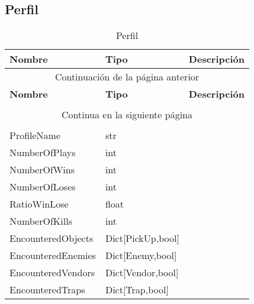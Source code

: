 \subsection{Perfil}

\begin{longtable}[H]{
    @{}
    l
    l
    l
    @{}
    }%

    \toprule        %
    \textbf{Nombre} & \textbf{Tipo} & \textbf{Descripción} \\      %
    \midrule        %
    \endfirsthead   %

    \multicolumn{3}{c}{Continuación de la página anterior}\\
    \toprule
    \textbf{Nombre} & \textbf{Tipo} & \textbf{Descripción} \\\\      %
    \midrule        %
    \endhead        %

    \midrule
    \multicolumn{3}{c}{Continua en la siguiente página}\\ %
    \endfoot        %

    \bottomrule
    \caption{Perfil \label{tab:entidad_perfil}} \\
    \endlastfoot    %

    ProfileName         & str                    & \\
    NumberOfPlays       & int                    & \\
    NumberOfWins        & int                    & \\
    NumberOfLoses       & int                    & \\
    RatioWinLose        & float                  & \\
    NumberOfKills       & int                    & \\
    EncounteredObjects  & Dict[PickUp,bool]      & \\
    EncounteredEnemies  & Dict[Enemy,bool]       & \\
    EncounteredVendors  & Dict[Vendor,bool]      & \\
    EncounteredTraps    & Dict[Trap,bool]        & \\
\end{longtable}